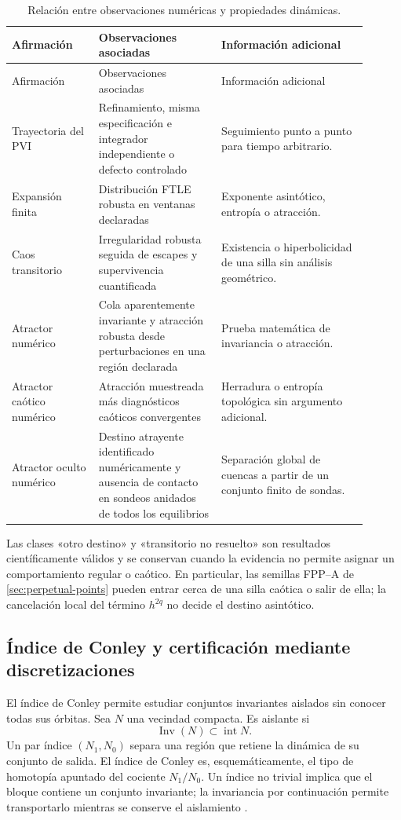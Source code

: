 \begin{longtable}{@{}L{0.22\linewidth}L{0.31\linewidth}L{0.37\linewidth}@{}}
\caption{Relación entre observaciones numéricas y propiedades dinámicas.}
\label{tab:reliability-promotion}\\
\toprule
Afirmación & Observaciones asociadas & Información adicional\\
\midrule
\endfirsthead
\toprule
Afirmación & Observaciones asociadas & Información adicional\\
\midrule
\endhead
Trayectoria del PVI & Refinamiento, misma especificación e integrador independiente
o defecto controlado & Seguimiento punto a punto para tiempo arbitrario.\\
Expansión finita & Distribución FTLE robusta en ventanas declaradas &
Exponente asintótico, entropía o atracción.\\
Caos transitorio & Irregularidad robusta seguida de escapes y supervivencia
cuantificada & Existencia o hiperbolicidad de una silla sin análisis
geométrico.\\
Atractor numérico & Cola aparentemente invariante y atracción robusta desde
perturbaciones en una región declarada & Prueba matemática de invariancia o
atracción.\\
Atractor caótico numérico & Atracción muestreada más diagnósticos caóticos convergentes &
Herradura o entropía topológica sin argumento adicional.\\
Atractor oculto numérico & Destino atrayente identificado numéricamente y ausencia de contacto en sondeos
anidados de todos los equilibrios & Separación global de cuencas a partir de
un conjunto finito de sondas.\\
\bottomrule
\end{longtable}

Las clases «otro destino» y «transitorio no resuelto» son resultados
científicamente válidos y se conservan cuando la evidencia no permite asignar
un comportamiento regular o caótico. En particular, las semillas FPP--A de
\cref{sec:perpetual-points} pueden entrar cerca de una silla caótica o salir
de ella; la cancelación local del término \(h^{2q}\) no decide el destino
asintótico.

\subsection{Índice de Conley y certificación mediante discretizaciones}

El índice de Conley permite estudiar conjuntos invariantes aislados sin
conocer todas sus órbitas. Sea \(N\) una vecindad compacta. Es aislante si
\begin{equation}
 \operatorname{Inv}(N)\subset\operatorname{int}N.
 \label{eq:reliability-isolating-neighborhood}
\end{equation}
Un par índice \((N_1,N_0)\) separa una región que retiene la dinámica de su
conjunto de salida. El índice de Conley es, esquemáticamente, el tipo de
homotopía apuntado del cociente \(N_1/N_0\). Un índice no trivial implica que
el bloque contiene un conjunto invariante; la invariancia por continuación
permite transportarlo mientras se conserve el aislamiento
\cite{Jost2005Dynamical,MischaikowEtAl2016Conley}.

